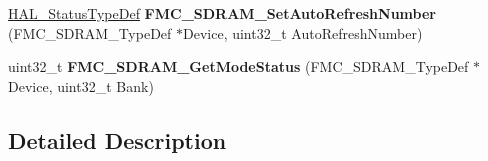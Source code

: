 \begin{DoxyCompactItemize}
\item 
\hyperlink{stm32f4xx__hal__def_8h_a63c0679d1cb8b8c684fbb0632743478f}{H\+A\+L\+\_\+\+Status\+Type\+Def} {\bfseries F\+M\+C\+\_\+\+S\+D\+R\+A\+M\+\_\+\+Set\+Auto\+Refresh\+Number} (F\+M\+C\+\_\+\+S\+D\+R\+A\+M\+\_\+\+Type\+Def $\ast$Device, uint32\+\_\+t Auto\+Refresh\+Number)\hypertarget{group___f_m_c___l_l___s_d_r_a_m___private___functions___group2_ga4f18f59507119e129bfdea88f25ca896}{}\label{group___f_m_c___l_l___s_d_r_a_m___private___functions___group2_ga4f18f59507119e129bfdea88f25ca896}

\item 
uint32\+\_\+t {\bfseries F\+M\+C\+\_\+\+S\+D\+R\+A\+M\+\_\+\+Get\+Mode\+Status} (F\+M\+C\+\_\+\+S\+D\+R\+A\+M\+\_\+\+Type\+Def $\ast$Device, uint32\+\_\+t Bank)\hypertarget{group___f_m_c___l_l___s_d_r_a_m___private___functions___group2_gacc01c14afaa0f4c1685a8ad52e0c9eeb}{}\label{group___f_m_c___l_l___s_d_r_a_m___private___functions___group2_gacc01c14afaa0f4c1685a8ad52e0c9eeb}

\end{DoxyCompactItemize}


\subsection{Detailed Description}
